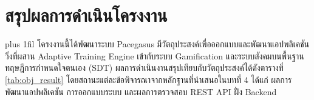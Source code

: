 
\section{สรุปผลการดำเนินโครงงาน}

\begingroup
\XeTeXlinebreakskip=0pt
\rightskip=0pt plus 1fil
โครงงานนี้ได้พัฒนาระบบ Pacegasus มีวัตถุประสงค์เพื่อออกแบบและพัฒนาแอปพลิเคชันวิ่งที่ผสาน Adaptive Training Engine เข้ากับระบบ Gamification และระบบสังคมบนพื้นฐานทฤษฎีการกำหนดใจตนเอง (SDT) ผลการดำเนินงานสรุปเทียบกับวัตถุประสงค์ได้ดังตารางที่ \ref{tab:obj_result} โดยสถานะแต่ละข้อพิจารณาจากหลักฐานที่นำเสนอในบทที่ 4 ได้แก่ ผลการพัฒนาแอปพลิเคชัน การออกแบบระบบ และผลการตรวจสอบ REST API ฝั่ง Backend\par
\endgroup

